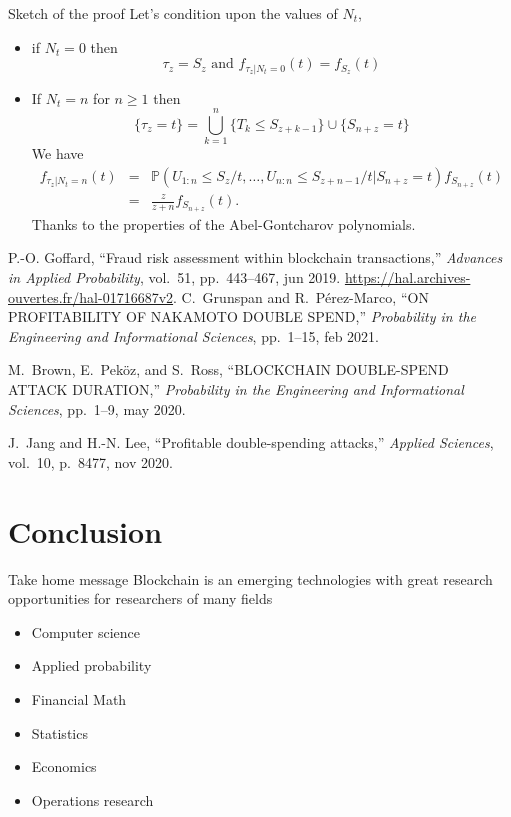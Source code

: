 \documentclass{beamer}
\begin{document}
\begin{frame}{Sketch of the proof}
\scriptsize
Let's condition upon the values of $N_t$,
\begin{itemize}
  \item if $N_t=0$ then 
  $$\tau_z = S_z\text{ and }f_{\tau_z|N_t=0}(t) = f_{S_z}(t)$$
  \item If $N_t = n$ for $n\geq 1$ then 
  $$
  \{\tau_z = t\} = \bigcup_{k = 1}^n\{T_k\leq S_{z+k-1}\}\cup\{S_{n+z} = t\}
  $$
We have 
\begin{eqnarray*}
f_{\tau_z|N_t = n}(t) &=& \mathbb{P}(U_{1:n}\leq S_z/t,\ldots,U_{n:n}\leq S_{z+n-1}/t\Big\rvert S_{n+z}=t)f_{S_{n+z}}(t)\\
&=&\frac{z}{z+n}f_{S_{n+z}}(t).
\end{eqnarray*}
Thanks to the properties of the Abel-Gontcharov polynomials.
\end{itemize}
\tiny
\begin{thebibliography}{1}

P.-O. Goffard, ``Fraud risk assessment within blockchain transactions,'' {\em
  Advances in Applied Probability}, vol.~51, pp.~443--467, jun 2019.
\newblock \url{https://hal.archives-ouvertes.fr/hal-01716687v2}.
C.~Grunspan and R.~P{\'{e}}rez-Marco, ``{ON} {PROFITABILITY} {OF} {NAKAMOTO}
  {DOUBLE} {SPEND},'' {\em Probability in the Engineering and Informational
  Sciences}, pp.~1--15, feb 2021.

M.~Brown, E.~Peköz, and S.~Ross, ``{BLOCKCHAIN} {DOUBLE}-{SPEND} {ATTACK}
  {DURATION},'' {\em Probability in the Engineering and Informational
  Sciences}, pp.~1--9, may 2020.

J.~Jang and H.-N. Lee, ``Profitable double-spending attacks,'' {\em Applied
  Sciences}, vol.~10, p.~8477, nov 2020.

\end{thebibliography}
\end{frame}
\section{Conclusion}
\begin{frame}{Take home message}
Blockchain is an emerging technologies with great research opportunities for researchers of many fields
\begin{itemize}
  \item Computer science
  \item Applied probability
  \item Financial Math
  \item Statistics
  \item Economics
  \item Operations research
\end{itemize}
\end{frame}
\end{document}

